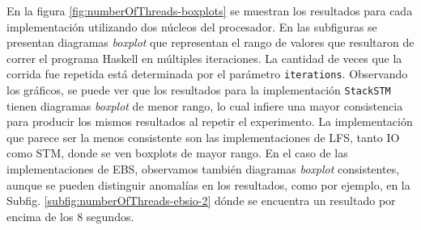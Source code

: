 En la figura \ref{fig:numberOfThreads-boxplots} se muestran los resultados para cada implementación utilizando dos núcleos del procesador.
En las subfiguras se presentan diagramas \emph{boxplot} que representan el rango de valores que resultaron de correr el programa Haskell en múltiples iteraciones.
La cantidad de veces que la corrida fue repetida está determinada por el parámetro \texttt{iterations}. Observando los gráficos, se puede ver que los resultados para la implementación \texttt{StackSTM} tienen diagramas \emph{boxplot} de menor rango, lo cual infiere una mayor consistencia para producir los mismos resultados al repetir el experimento.
La implementación que parece ser la menos consistente son las implementaciones de LFS, tanto IO como STM, donde se ven boxplots de mayor rango.
En el caso de las implementaciones de EBS, observamos también diagramas \emph{boxplot} consistentes, aunque se pueden distinguir anomalías en los resultados, como por ejemplo, en la Subfig. \ref{subfig:numberOfThreads-ebsio-2} dónde se encuentra un resultado por encima de los 8 segundos.

